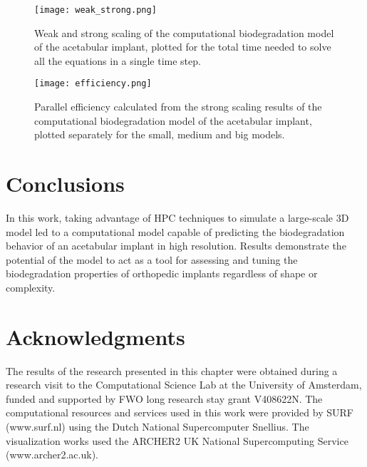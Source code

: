 \begin{figure}[h]
\centering
\medskip
\texttt{[image: weak\_strong.png]}
\caption[Weak and strong scaling of the acetabular implant model]{Weak and strong scaling of the computational biodegradation model of the acetabular implant, plotted for the total time needed to solve all the equations in a single time step.} \label{fig:cup_weak_strong}
\end{figure}

\begin{figure}[h]
\centering
\medskip
\texttt{[image: efficiency.png]}
\caption[Parallel efficiency of the acetabular implant model]{Parallel efficiency calculated from the strong scaling results of the computational biodegradation model of the acetabular implant, plotted separately for the small, medium and big models.} \label{fig:cup_efficiency}
\end{figure}

\clearpage

\section{Conclusions}

In this work, taking advantage of \gls{HPC} techniques to simulate a large-scale 3D model led to a computational model capable of predicting the biodegradation behavior of an acetabular implant in high resolution. Results demonstrate the potential of the model to act as a tool for assessing and tuning the biodegradation properties of orthopedic implants regardless of shape or complexity.

\section*{Acknowledgments}

The results of the research presented in this chapter were obtained during a research visit to the Computational Science Lab at the University of Amsterdam, funded and supported by FWO long research stay grant V408622N. The computational resources and services used in this work were provided by SURF (www.surf.nl) using the Dutch National Supercomputer Snellius. The visualization works used the ARCHER2 UK National Supercomputing Service (www.archer2.ac.uk).


\cleardoublepage

